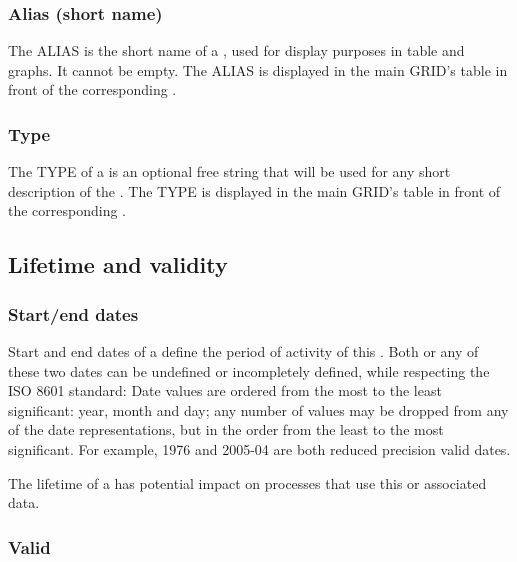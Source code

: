 \subsubsection{Alias (short name)}

The ALIAS is the short name of a , used for display purposes in table and graphs. It cannot be empty. The ALIAS is displayed in the main GRID's table in front of the corresponding .



\subsubsection{Type}

The TYPE of a  is an optional free string that will be used for any short description of the . The TYPE is displayed in the main GRID's table in front of the corresponding .


\subsection{Lifetime and validity}

\subsubsection{Start/end dates}

Start and end dates of a  define the period of activity of this . Both or any of these two dates can be undefined or incompletely defined, while respecting the ISO 8601 standard: Date values are ordered from the most to the least significant: year, month and day; any number of values may be dropped from any of the date representations, but in the order from the least to the most significant. For example, 1976 and 2005-04 are both reduced precision valid dates.

The lifetime of a  has potential impact on processes that use this  or associated data.


\subsubsection{Valid }

